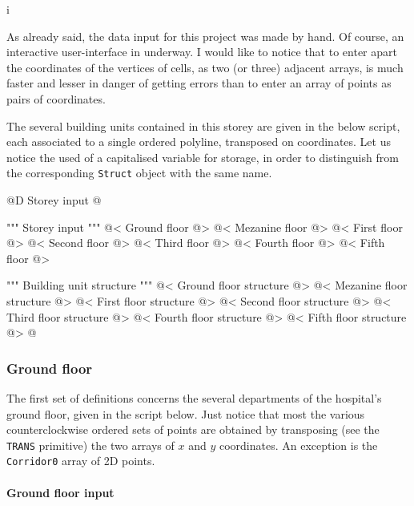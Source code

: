 i\documentclass[11pt,oneside]{article}    %
\begin{document}
As already said, the data input for this project was made by hand. Of course, an
interactive user-interface in underway. I would like to notice that to enter apart the 
coordinates of the vertices of cells, as two (or three) adjacent arrays, is much 
faster and lesser in danger of getting errors than to enter an array of points as 
pairs of coordinates.

The several building units contained in this storey are given in the below script,
each associated to a single ordered polyline, transposed on coordinates. Let us notice the used of 
a capitalised variable for storage, in order to distinguish from the corresponding \texttt{Struct}
object with the same name.

@D Storey input
@{""" Storey input """
@< Ground floor @>
@< Mezanine floor @>
@< First floor @>
@< Second floor @>
@< Third floor @>
@< Fourth floor @>
@< Fifth floor @>

""" Building unit structure """
@< Ground floor structure @>
@< Mezanine floor structure @>
@< First floor structure @>
@< Second floor structure @>
@< Third floor structure @>
@< Fourth floor structure @>
@< Fifth floor structure @>
@}


\subsubsection{Ground floor}

The first set of definitions concerns the several departments of the hospital's ground floor,
given in the script below. Just notice that most the various counterclockwise ordered sets of points are obtained by 
transposing (see the \texttt{TRANS} primitive) the two arrays of $x$ and $y$ coordinates. An exception is the \texttt{Corridor0} array of 2D points.

\paragraph{Ground floor input}
\end{document}
